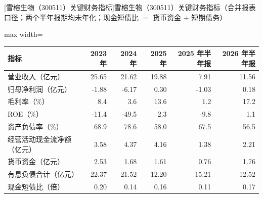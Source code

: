 \begin{center}\small\setlength{\tabcolsep}{3.4pt}
[雪榕生物（300511）关键财务指标]{雪榕生物（300511）关键财务指标（合并报表口径；两个半年报期均未年化；现金短债比 $=$ 货币资金 $\div$ 短期债务）}
\begin{adjustbox}{max width=\textwidth}
\begin{tabular}{@{}lrrrrr@{}}
\toprule
指标 & 2023 年 & 2024 年 & 2025 年 & 2025 年半年报 & 2026 年半年报 \\
\midrule
营业收入（亿元） & 25.65 & 21.62 & 19.88 & 7.91 & 11.56 \\
归母净利润（亿元） & -1.88 & -6.17 & 0.30 & -1.03 & 0.18 \\
毛利率（\%） & 8.4 & 3.6 & 13.6 & 1.2 & 17.2 \\
ROE（\%） & -11.4 & -49.5 & 2.3 & -9.8 & 1.1 \\
资产负债率（\%） & 68.9 & 78.6 & 58.0 & 67.5 & 56.5 \\
经营活动现金流净额（亿元） & 3.58 & 4.37 & 4.16 & 1.38 & 2.21 \\
货币资金（亿元） & 2.53 & 1.68 & 1.61 & 0.76 & 1.76 \\
有息负债合计（亿元） & 22.37 & 21.52 & 12.20 & 15.21 & 12.52 \\
现金短债比（倍） & 0.20 & 0.14 & 0.16 & 0.11 & 0.17 \\
\bottomrule
\end{tabular}
\end{adjustbox}
\end{center}

